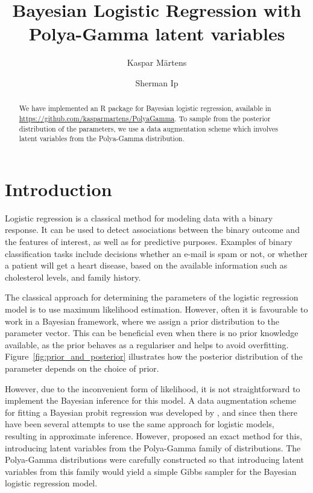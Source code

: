 \documentclass[a4paper]{article}\usepackage[]{graphicx}\usepackage[]{color}
\title{Bayesian Logistic Regression with Polya-Gamma latent variables}
\author{Kaspar Märtens \and Sherman Ip}
\begin{document}
\maketitle

\begin{abstract}
We have implemented an R package for Bayesian logistic regression, available in \url{https://github.com/kasparmartens/PolyaGamma}. To sample from the posterior distribution of the parameters, we use a data augmentation scheme which involves latent variables from the Polya-Gamma distribution.
\end{abstract}

\section{Introduction}

Logistic regression is a classical method for modeling data with a binary response. It can be used to detect associations between the binary outcome and the features of interest, as well as for predictive purposes. Examples of binary classification tasks include decisions whether an e-mail is spam or not, or whether a patient will get a heart disease, based on the available information such as cholesterol levels, and family history.

The classical approach for determining the parameters of the logistic regression model is to use maximum likelihood estimation. %
However, often it is favourable to work in a Bayesian framework, where we assign a prior distribution to the parameter vector. This can be beneficial even when there is no prior knowledge available, as the prior behaves as a regulariser and helps to avoid overfitting. Figure~\ref{fig:prior_and_posterior} illustrates how the posterior distribution of the parameter depends on the choice of prior.

However, due to the inconvenient form of likelihood, it is not straightforward to implement the Bayesian inference for this model. A data augmentation scheme for fitting a Bayesian probit regression was developed by \cite{albert1993bayesian}, and since then there have been several attempts to use the same approach for logistic models, resulting in approximate inference. However, \cite{polson2013bayesian} proposed an exact method for this, introducing latent variables from the Polya-Gamma family of distributions. The Polya-Gamma distributions were carefully constructed so that introducing latent variables from this family would yield a simple Gibbs sampler for the Bayesian logistic regression model.
\end{document}
